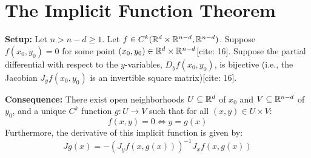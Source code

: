 \section{The Implicit Function Theorem}

\begin{theorem*}
\textbf{Setup:} Let $n > n-d \ge 1$. Let $f \in C^k(\mathbb{R}^d \times \mathbb{R}^{n-d}, \mathbb{R}^{n-d})$. Suppose $f(x_0, y_0) = 0$ for some point $(x_0, y_0) \in \mathbb{R}^d \times \mathbb{R}^{n-d}$[cite: 16]. 
Suppose the partial differential with respect to the $y$-variables, $D_y f(x_0, y_0)$, is bijective (i.e., the Jacobian $J_y f(x_0, y_0)$ is an invertible square matrix)[cite: 16].

\textbf{Consequence:} There exist open neighborhoods $U \subseteq \mathbb{R}^d$ of $x_0$ and $V \subseteq \mathbb{R}^{n-d}$ of $y_0$, and a unique $C^k$ function $g: U \to V$ such that for all $(x,y) \in U \times V$:
\[ f(x,y) = 0 \iff y = g(x) \]
Furthermore, the derivative of this implicit function is given by:
\[ Jg(x) = -\left( J_y f(x, g(x)) \right)^{-1} J_x f(x, g(x)) \]
\end{theorem*}


